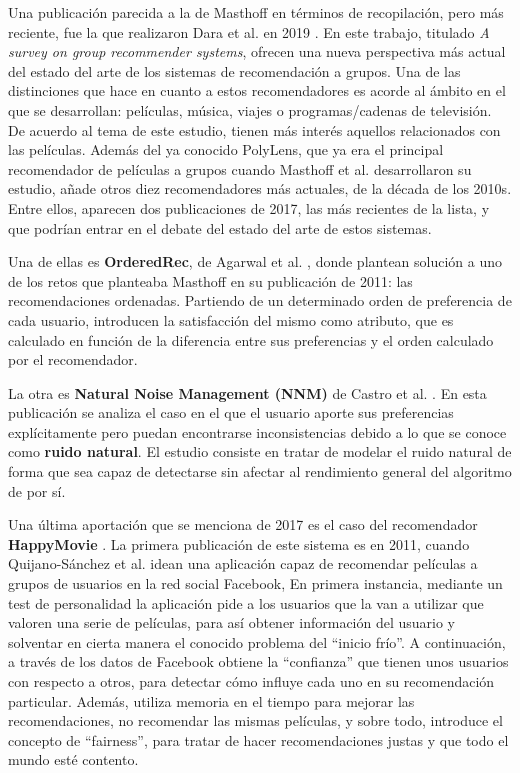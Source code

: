 Una publicación parecida a la de Masthoff en términos de recopilación, pero más reciente, fue la que realizaron Dara et al. en 2019 \cite{survey2019}. En este trabajo, titulado \textit{A survey on group recommender systems}, ofrecen una nueva perspectiva más actual del estado del arte de los sistemas de recomendación a grupos. Una de las distinciones que hace en cuanto a estos recomendadores es acorde al ámbito en el que se desarrollan: películas, música, viajes o programas/cadenas de televisión. De acuerdo al tema de este estudio, tienen más interés aquellos relacionados con las películas. Además del ya conocido PolyLens, que ya era el principal recomendador de películas a grupos cuando Masthoff et al. desarrollaron su estudio, añade otros diez recomendadores más actuales, de la década de los 2010s. Entre ellos, aparecen dos publicaciones de 2017, las más recientes de la lista, y que podrían entrar en el debate del estado del arte de estos sistemas.

Una de ellas es \textbf{OrderedRec}, de Agarwal et al. \cite{orderedrec}, donde plantean solución a uno de los retos que planteaba Masthoff en su publicación de 2011: las recomendaciones ordenadas. Partiendo de un determinado orden de preferencia de cada usuario, introducen la satisfacción del mismo como atributo, que es calculado en función de la diferencia entre sus preferencias y el orden calculado por el recomendador.

La otra es \textbf{Natural Noise Management (NNM)} de Castro et al. \cite{nnm}. En esta publicación se analiza el caso en el que el usuario aporte sus preferencias explícitamente pero puedan encontrarse inconsistencias debido a lo que se conoce como \textbf{ruido natural}. El estudio consiste en tratar de modelar el ruido natural de forma que sea capaz de detectarse sin afectar al rendimiento general del algoritmo de por sí.

Una última aportación que se menciona de 2017 es el caso del recomendador \textbf{HappyMovie} \cite{happymovie2011}. La primera publicación de este sistema es en 2011, cuando Quijano-Sánchez et al. idean una aplicación capaz de recomendar películas a grupos de usuarios en la red social Facebook, En primera instancia, mediante un test de personalidad la aplicación pide a los usuarios que la van a utilizar que valoren una serie de películas, para así obtener información del usuario y solventar en cierta manera el conocido problema del ``inicio frío''. A continuación, a través de los datos de Facebook obtiene la ``confianza'' que tienen unos usuarios con respecto a otros, para detectar cómo influye cada uno en su recomendación particular. Además, utiliza memoria en el tiempo para mejorar las recomendaciones, no recomendar las mismas películas, y sobre todo, introduce el concepto de ``fairness'', para tratar de hacer recomendaciones justas y que todo el mundo esté contento.

